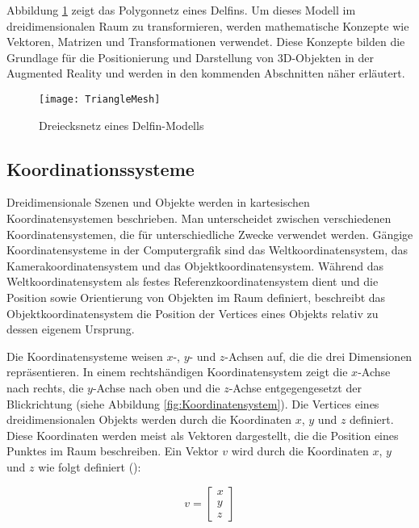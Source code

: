 Abbildung \ref{fig:TriangleMesh} zeigt das Polygonnetz eines Delfins. Um dieses Modell im dreidimensionalen Raum zu transformieren, werden mathematische Konzepte wie Vektoren, Matrizen und Transformationen verwendet. Diese Konzepte bilden die Grundlage für die Positionierung und Darstellung von 3D-Objekten in der Augmented Reality und werden in den kommenden Abschnitten näher erläutert. \cite{wikipedia2023mesh, espinoza2024graphics}

\begin{figure}
    \centering
    \texttt{[image: TriangleMesh]}
    \caption{Dreiecksnetz eines Delfin-Modells \cite{wikipedia2023mesh}\label{fig:TriangleMesh}}\par
\end{figure}

\subsection{Koordinationssysteme}

Dreidimensionale Szenen und Objekte werden in kartesischen Koordinatensystemen beschrieben. Man unterscheidet zwischen verschiedenen Koordinatensystemen, die für unterschiedliche Zwecke verwendet werden. Gängige Koordinatensysteme in der Computergrafik sind das Weltkoordinatensystem, das Kamerakoordinatensystem und das Objektkoordinatensystem. Während das Weltkoordinatensystem als festes Referenzkoordinatensystem dient und die Position sowie Orientierung von Objekten im Raum definiert, beschreibt das Objektkoordinatensystem die Position der Vertices eines Objekts relativ zu dessen eigenem Ursprung. \cite{doerner2022virtual, gao2021vSLAM, usau2023appleARCamera}

Die Koordinatensysteme weisen \(x\)-, \(y\)- und \(z\)-Achsen auf, die die drei Dimensionen repräsentieren. In einem rechtshändigen Koordinatensystem zeigt die \(x\)-Achse nach rechts, die \(y\)-Achse nach oben und die \(z\)-Achse entgegengesetzt der Blickrichtung (siehe Abbildung \ref{fig:Koordinatensystem}). Die Vertices eines dreidimensionalen Objekts werden durch die Koordinaten \(x\), \(y\) und \(z\) definiert. Diese Koordinaten werden meist als Vektoren dargestellt, die die Position eines Punktes im Raum beschreiben. Ein Vektor \(v\) wird durch die Koordinaten \(x\), \(y\) und \(z\) wie folgt definiert (\cite{doerner2022virtual, gao2021vSLAM, freescale2010math3d, pezzi2021matrices}):

\begin{equation}
v = \begin{bmatrix} x \\ y \\ z \end{bmatrix}
\end{equation}

